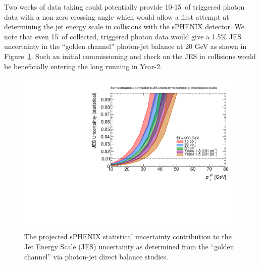 Two weeks of data taking could potentially provide 10-15~\pb of triggered photon
\pp data with a non-zero crossing angle which would allow a first attempt 
at determining the jet energy scale in \pp collisions with the sPHENIX detector.
We note that even 15~\pb of collected, triggered photon data would give a 1.5\%
JES uncertainty in the ``golden channel'' photon-jet balance at 20 GeV as shown in Figure~\ref{fig:jes}.   Such an initial commissioning and check on the JES in \pp collisions would be beneficially entering the long \pp running in Year-2.

\begin{figure}
    \centering
    \includegraphics[width=0.8\linewidth]{figs/CompareSqrtsBUR.pdf}
    \caption{The projected sPHENIX statistical uncertainty contribution to the Jet Energy Scale (JES) uncertainty as determined from the ``golden channel'' via photon-jet direct balance studies.}
    \label{fig:jes}
\end{figure}

